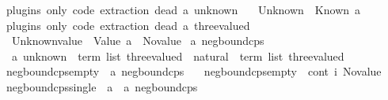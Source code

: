 \begin{isabellebody}
\isanewline
{}\isamarkupfalse%
\ {\isacharparenleft}{\kern0pt}plugins\ only{\isacharcolon}{\kern0pt}\ code\ extraction{\isacharparenright}{\kern0pt}\ {\isacharparenleft}{\kern0pt}dead\ {\isacharprime}{\kern0pt}a{\isacharparenright}{\kern0pt}\ unknown\ {\isacharequal}{\kern0pt}\isanewline
\ \ Unknown\ {\isacharbar}{\kern0pt}\ Known\ {\isacharprime}{\kern0pt}a\isanewline
\isanewline
{}\isamarkupfalse%
\ {\isacharparenleft}{\kern0pt}plugins\ only{\isacharcolon}{\kern0pt}\ code\ extraction{\isacharparenright}{\kern0pt}\ {\isacharparenleft}{\kern0pt}dead\ {\isacharprime}{\kern0pt}a{\isacharparenright}{\kern0pt}\ three{\isacharunderscore}{\kern0pt}valued\ {\isacharequal}{\kern0pt}\isanewline
\ \ Unknown{\isacharunderscore}{\kern0pt}value\ {\isacharbar}{\kern0pt}\ Value\ {\isacharprime}{\kern0pt}a\ {\isacharbar}{\kern0pt}\ No{\isacharunderscore}{\kern0pt}value\isanewline
\isanewline
{}\isamarkupfalse%
\ {\isacharprime}{\kern0pt}a\ neg{\isacharunderscore}{\kern0pt}bound{\isacharunderscore}{\kern0pt}cps\ {\isacharequal}{\kern0pt}\isanewline
\ \ {\isachardoublequoteopen}{\isacharparenleft}{\kern0pt}{\isacharprime}{\kern0pt}a\ unknown\ {\isasymRightarrow}\ term\ list\ three{\isacharunderscore}{\kern0pt}valued{\isacharparenright}{\kern0pt}\ {\isasymRightarrow}\ natural\ {\isasymRightarrow}\ term\ list\ three{\isacharunderscore}{\kern0pt}valued{\isachardoublequoteclose}\isanewline
\isanewline
{}\isamarkupfalse%
\ neg{\isacharunderscore}{\kern0pt}bound{\isacharunderscore}{\kern0pt}cps{\isacharunderscore}{\kern0pt}empty\ {\isacharcolon}{\kern0pt}{\isacharcolon}{\kern0pt}\ {\isachardoublequoteopen}{\isacharprime}{\kern0pt}a\ neg{\isacharunderscore}{\kern0pt}bound{\isacharunderscore}{\kern0pt}cps{\isachardoublequoteclose}\isanewline
\ \ \ {\isachardoublequoteopen}neg{\isacharunderscore}{\kern0pt}bound{\isacharunderscore}{\kern0pt}cps{\isacharunderscore}{\kern0pt}empty\ {\isacharequal}{\kern0pt}\ {\isacharparenleft}{\kern0pt}{\isasymlambda}cont\ i{\isachardot}{\kern0pt}\ No{\isacharunderscore}{\kern0pt}value{\isacharparenright}{\kern0pt}{\isachardoublequoteclose}\isanewline
\isanewline
{}\isamarkupfalse%
\ neg{\isacharunderscore}{\kern0pt}bound{\isacharunderscore}{\kern0pt}cps{\isacharunderscore}{\kern0pt}single\ {\isacharcolon}{\kern0pt}{\isacharcolon}{\kern0pt}\ {\isachardoublequoteopen}{\isacharprime}{\kern0pt}a\ {\isasymRightarrow}\ {\isacharprime}{\kern0pt}a\ neg{\isacharunderscore}{\kern0pt}bound{\isacharunderscore}{\kern0pt}cps{\isachardoublequoteclose}\isanewline

\end{isabellebody}
